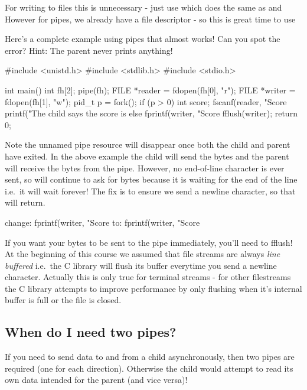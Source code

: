 \begin{enumerate}
For writing to files this is unnecessary - just use  which does the same as  and  However for pipes, we already have a file descriptor - so this is great time to use  

Here's a complete example using pipes that almost works! Can you spot the error? Hint: The parent never prints anything!

\begin{code}[language=C]
#include <unistd.h>
#include <stdlib.h>
#include <stdio.h>

int main() {
    int fh[2];
    pipe(fh);
    FILE *reader = fdopen(fh[0], "r");
    FILE *writer = fdopen(fh[1], "w");
    pid_t p = fork();
    if (p > 0) {
        int score;
        fscanf(reader, "Score %
        printf("The child says the score is %
    } else {
        fprintf(writer, "Score %
        fflush(writer);
    }
    return 0;
}
\end{code}

Note the unnamed pipe resource will disappear once both the child and parent have exited. In the above example the child will send the bytes and the parent will receive the bytes from the pipe. However, no end-of-line character is ever sent, so  will continue to ask for bytes because it is waiting for the end of the line i.e.~it will wait forever! The fix is to ensure we send a newline character, so that  will return.

\begin{code}[language=C]
change:   fprintf(writer, "Score %
to:       fprintf(writer, "Score %
\end{code}

If you want your bytes to be sent to the pipe immediately, you'll need to fflush! At the beginning of this course we assumed that file streams are always \emph{line buffered} i.e.~the C library will flush its buffer everytime you send a newline character. Actually this is only true for terminal streams - for other filestreams the C library attempts to improve performance by only flushing when it's internal buffer is full or the file is closed.

\subsection{When do I need two pipes?}

If you need to send data to and from a child asynchronously, then two pipes are required (one for each direction). Otherwise the child would attempt to read its own data intended for the parent (and vice versa)!


\end{enumerate}
